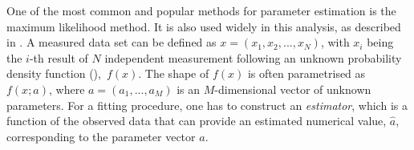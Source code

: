 One of the most common and popular methods for parameter estimation is the maximum likelihood method. 
It is also used widely in this analysis, as described in .
A measured data set can be defined as $x = (x_1, x_2,...,x_N)$, with $x_i$ being the $i$-th result of $N$ independent measurement following an unknown probability density function (\PDF),~$f(x)$.
The shape of $f(x)$ is often parametrised as $f(x; a)$, where $a=(a_1,...,a_M)$ is an $M$-dimensional vector of unknown parameters. 
For a fitting procedure, one has to construct an \textit{estimator}, which is a function of the observed data that can provide an estimated numerical value, $\hat{a}$, corresponding to the parameter vector $a$.



